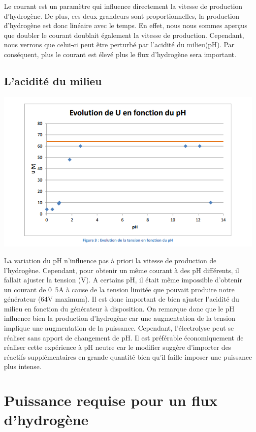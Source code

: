 \documentclass[10pt,a4paper]{article}
\begin{document}
Le courant est un paramètre qui influence directement la vitesse de production d'hydrogène. De plus, ces deux grandeurs sont proportionnelles, la production d'hydrogène est donc linéaire avec le temps. En effet, nous nous sommes aperçus que doubler le courant doublait également la vitesse de production. Cependant, nous verrons que celui-ci peut être perturbé par l'acidité du milieu(pH). Par conséquent, plus le courant est élevé plus le flux d'hydrogène sera important.


\subsection{L'acidité du milieu}

\includegraphics[scale=0.6]{poi.png} 


La variation du pH n'influence pas à priori la vitesse de production de l'hydrogène. Cependant, pour obtenir un même courant à des pH différents, il fallait ajuster la tension (V). A certains pH, il était même impossible d'obtenir un courant de \unit{0.5}{A} à cause de la tension limitée que pouvait produire notre générateur (\unit{64}{V} maximum). Il est donc important de bien ajuster l'acidité du milieu en fonction du générateur à disposition. On remarque donc que le pH influence bien la production d'hydrogène car une augmentation de la tension implique une augmentation de la puissance. Cependant, l'électrolyse peut se réaliser sans apport de changement de pH. Il est  préférable économiquement de réaliser cette expérience à pH neutre car le modifier suggère d'importer des réactifs supplémentaires en grande quantité bien qu'il faille imposer une puissance plus intense. 

\section{Puissance requise pour un flux d'hydrogène}
\end{document}
